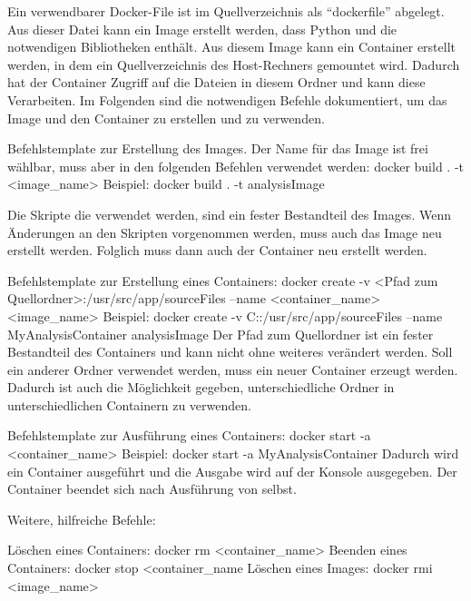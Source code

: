 Ein verwendbarer Docker-File ist im Quellverzeichnis als \enquote{dockerfile} abgelegt.
Aus dieser Datei kann ein Image erstellt werden, dass Python und die notwendigen Bibliotheken enthält.
Aus diesem Image kann ein Container erstellt werden, in dem ein Quellverzeichnis des Host-Rechners gemountet wird.
Dadurch hat der Container Zugriff auf die Dateien in diesem Ordner und kann diese Verarbeiten.
Im Folgenden sind die notwendigen Befehle dokumentiert, um das Image und den Container zu erstellen und zu verwenden.
{}{}
	
\begin{DockerCommands}
Befehlstemplate zur Erstellung des Images. Der Name für das Image ist frei wählbar,
muss aber in den folgenden Befehlen verwendet werden:
	docker build . -t <image_name>
Beispiel:
	docker build . -t analysisImage
	
Die Skripte die verwendet werden, sind ein fester Bestandteil des Images.
Wenn Änderungen an den Skripten vorgenommen werden, muss auch das Image neu erstellt
werden.
Folglich muss dann auch der Container neu erstellt werden.
		
Befehlstemplate zur Erstellung eines Containers:
	docker create  -v <Pfad zum Quellordner>:/usr/src/app/sourceFiles  --name <container_name>  <image_name>
Beispiel:	
	docker create  -v C:\Temp\sourcefiles:/usr/src/app/sourceFiles  --name MyAnalysisContainer  analysisImage
Der Pfad zum Quellordner ist ein fester Bestandteil des Containers und kann nicht
ohne weiteres verändert werden.
Soll ein anderer Ordner verwendet werden, muss ein neuer Container erzeugt werden.
Dadurch ist auch die Möglichkeit gegeben, unterschiedliche Ordner in 
unterschiedlichen Containern zu verwenden.

Befehlstemplate zur Ausführung eines Containers:
	docker start -a <container_name>
Beispiel:
	docker start -a MyAnalysisContainer
Dadurch wird ein Container ausgeführt und die Ausgabe wird auf der Konsole 
ausgegeben. Der Container beendet sich nach Ausführung von selbst.



Weitere, hilfreiche Befehle:

Löschen eines Containers:
	docker rm <container_name>
Beenden eines Containers:
	docker stop <container_name
Löschen eines Images:
	docker rmi <image_name>
\end{DockerCommands}
